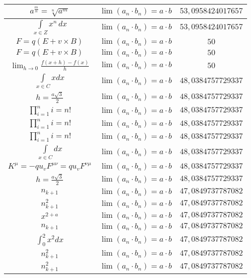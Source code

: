 \documentclass{article}
\begin{document}
\begin{flushleft}
\begin{longtable}{|c|c|c|}
$a^{\frac{m}{n}}=\sqrt[n]{a^{m}}$ & $\lim\left(a_n\cdot b_n\right)=a\cdot b$ & $53,0958424017657$ \\ \hline 
$\int \limits_{x\in Z}\!x^{n}\,dx$ & $\lim\left(a_n\cdot b_n\right)=a\cdot b$ & $53,0958424017657$ \\ \hline 
$F=q\left(E+v\times B\right)$ & $\lim\left(a_n\cdot b_n\right)=a\cdot b$ & $50$ \\ \hline 
$F=q\left(E+v\times B\right)$ & $\lim\left(a_n\cdot b_n\right)=a\cdot b$ & $50$ \\ \hline 
$\lim_{h\to0}\frac{f(x+h)-f(x)}{h}$ & $\lim\left(a_n\cdot b_n\right)=a\cdot b$ & $50$ \\ \hline 
$\int \limits_{x\in C}xdx$ & $\lim\left(a_n\cdot b_n\right)=a\cdot b$ & $48,0384757729337$ \\ \hline 
$h=\frac{a\sqrt{3}}{2}$ & $\lim\left(a_n\cdot b_n\right)=a\cdot b$ & $48,0384757729337$ \\ \hline 
$\prod_{i=1}^ni=n!$ & $\lim\left(a_n\cdot b_n\right)=a\cdot b$ & $48,0384757729337$ \\ \hline 
$\prod_{i=1}^ni=n!$ & $\lim\left(a_n\cdot b_n\right)=a\cdot b$ & $48,0384757729337$ \\ \hline 
$\prod_{i=1}^ni=n!$ & $\lim\left(a_n\cdot b_n\right)=a\cdot b$ & $48,0384757729337$ \\ \hline 
$\int \limits_{x\in C}dx$ & $\lim\left(a_n\cdot b_n\right)=a\cdot b$ & $48,0384757729337$ \\ \hline 
$K^\mu=-qu_vF^{\mu\nu}=qu_vF^{\nu\mu}$ & $\lim\left(a_n\cdot b_n\right)=a\cdot b$ & $48,0384757729337$ \\ \hline 
$h=\frac{a\sqrt{3}}{2}$ & $\lim\left(a_n\cdot b_n\right)=a\cdot b$ & $48,0384757729337$ \\ \hline 
$n_{k+1}$ & $\lim\left(a_n\cdot b_n\right)=a\cdot b$ & $47,0849737787082$ \\ \hline 
$n_{k+1}^2$ & $\lim\left(a_n\cdot b_n\right)=a\cdot b$ & $47,0849737787082$ \\ \hline 
$x^{2+a}$ & $\lim\left(a_n\cdot b_n\right)=a\cdot b$ & $47,0849737787082$ \\ \hline 
$n_{k+1}$ & $\lim\left(a_n\cdot b_n\right)=a\cdot b$ & $47,0849737787082$ \\ \hline 
$\int _0^2x^2dx$ & $\lim\left(a_n\cdot b_n\right)=a\cdot b$ & $47,0849737787082$ \\ \hline 
$n_{k+1}^2$ & $\lim\left(a_n\cdot b_n\right)=a\cdot b$ & $47,0849737787082$ \\ \hline 
$n_{k+1}^2$ & $\lim\left(a_n\cdot b_n\right)=a\cdot b$ & $47,0849737787082$ \\ \hline 

\end{longtable}
\end{flushleft}
\end{document}
